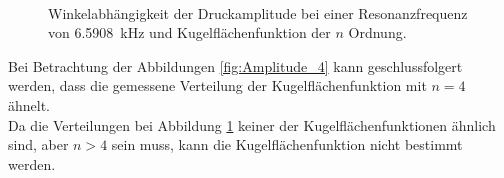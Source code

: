 \begin{figure}
    \\
    \caption{Winkelabhängigkeit der Druckamplitude bei einer Resonanzfrequenz von \SI{6.5908}{\kilo\hertz} und Kugelflächenfunktion der $n$ Ordnung.}
    \label{fig:Amplitude_6}
\end{figure}
\FloatBarrier
Bei Betrachtung der Abbildungen \ref{fig:Amplitude_4} kann geschlussfolgert werden, 
dass die gemessene Verteilung der Kugelflächenfunktion mit $n=4$ ähnelt. \\
Da die Verteilungen bei Abbildung \ref{fig:Amplitude_6} keiner der Kugelflächenfunktionen ähnlich sind, aber
$n>4$ sein muss, kann die Kugelflächenfunktion nicht bestimmt werden.


